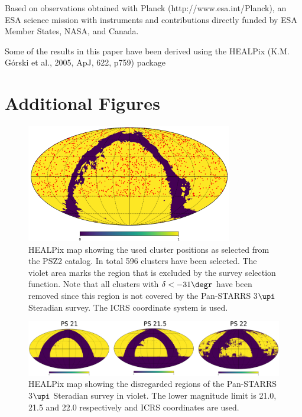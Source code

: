 \documentclass[a4paper,fleqn,usenatbib]{mnras}
\begin{document}
Based on observations obtained with Planck (http://www.esa.int/Planck), an ESA science mission with instruments and contributions directly funded by ESA Member States, NASA, and Canada.

Some of the results in this paper have been derived using the HEALPix (K.M. Górski et al., 2005, ApJ, 622, p759) package


 

\newpage

\appendix

\section{Additional Figures}
\label{sec:figures}

\begin{figure}
    \includegraphics[width= \columnwidth]{Planck_pres.png}
\caption{HEALPix map showing the used cluster positions as selected from the PSZ2 catalog. In total 596 clusters have been selected. The violet area marks the region that is excluded by the survey selection function. Note that all clusters with $\delta<-31\degr$ have been removed since this region is not covered by the Pan-STARRS 3$\upi$ Steradian survey. The ICRS coordinate system is used.}
    \label{fig:planck_fig} 
\end{figure}

\begin{figure}
    \includegraphics[width= \textwidth]{heal_maps.png}
\caption{HEALPix map showing the disregarded regions of the Pan-STARRS 3$\upi$ Steradian survey in violet. The lower magnitude limit is 21.0, 21.5 and 22.0 respectively and ICRS coordinates are used.}
   \label{fig:heal_map} 
\end{figure}
\end{document}
